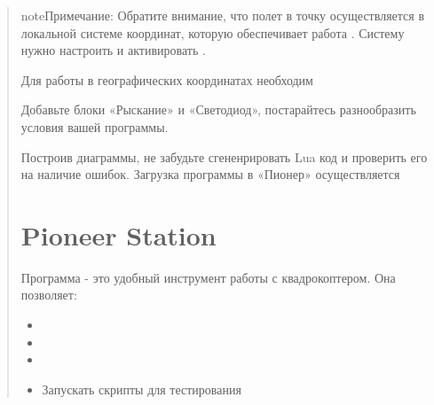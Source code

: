 \documentclass[a4paper,10pt,russian]{sphinxmanual}
\begin{document}
\begin{quote}
\begin{sphinxadmonition}{note}{Примечание:}
Обратите внимание, что полет в точку осуществляется в локальной системе координат, которую обеспечивает работа {\hyperref[\detokenize{indoor_nav::doc}]{}}. Систему нужно настроить и активировать .
\end{sphinxadmonition}

Для работы в географических координатах необходим {\hyperref[\detokenize{module/gps::doc}]{}}


Добавьте блоки «Рыскание» и «Светодиод», постарайтесь разнообразить условия вашей программы.

Построив диаграммы, не забудьте сгененрировать Lua код и проверить его на наличие ошибок. Загрузка программы в «Пионер» осуществляется 


\section{Pioneer Station}
\label{\detokenize{programming/pioneer_station/pioneer_station_main:pioneer-station}}\label{\detokenize{programming/pioneer_station/pioneer_station_main::doc}}

Программа  - это удобный инструмент работы с квадрокоптером. Она позволяет:
\begin{itemize}
\item {} 

\item {} 

\item {} 

\item {} 
Запускать скрипты для тестирования


\end{itemize}
\end{quote}
\end{document}
